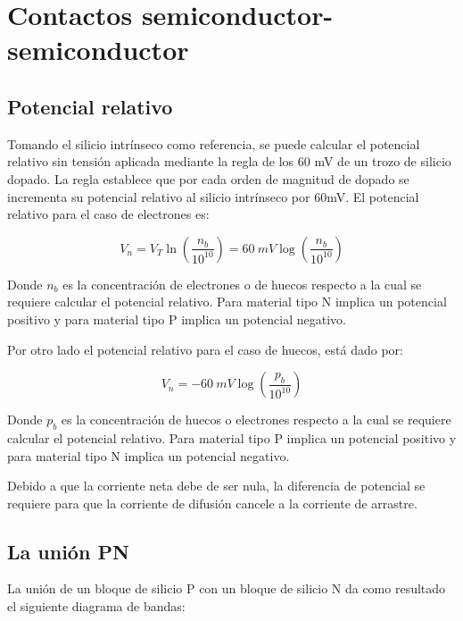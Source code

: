 

\newpage
\chapter{Contactos semiconductor-semiconductor}


\section{Potencial relativo}

Tomando el silicio intrínseco como referencia, se puede calcular el potencial relativo sin tensión aplicada mediante la regla de los 60 mV de un trozo de silicio dopado. La regla establece que por cada orden de magnitud de dopado se incrementa su potencial relativo al silicio intrínseco por 60mV. El potencial relativo para el caso de electrones es: 

\[ V_{n} = V_{T} \ln \left(\dfrac{n_{b}}{10^{10}} \right) = 60\ mV \log \left(\dfrac{n_{b}}{10^{10}}\right) \]

Donde $n_{b}$ es la concentración de electrones o de huecos respecto a la cual se requiere calcular el potencial relativo. Para material tipo N implica un potencial positivo y para material tipo P implica un potencial negativo.

Por otro lado el potencial relativo para el caso de huecos, está dado por:

\[ V_{n} = -60\ mV \log \left(\dfrac{p_{b}}{10^{10}}\right) \]

Donde $p_{b}$ es la concentración de huecos o electrones respecto a la cual se requiere calcular el potencial relativo. Para material tipo P implica un potencial positivo y para material tipo N implica un potencial negativo.

Debido a que la corriente neta debe de ser nula, la diferencia de potencial se requiere para que la corriente de difusión cancele a la corriente de arrastre.

\newpage
\section{La unión PN}

La unión de un bloque de silicio P con un bloque de silicio N da como resultado el siguiente diagrama de bandas:

